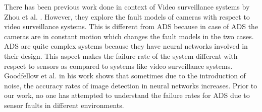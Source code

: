 There has been previous work done in context of Video surveillance systems by Zhou et al. \cite{Zhou}. However, they explore the fault models of cameras with respect to video surveillance systems. This is different from ADS because in case of ADS the cameras are in constant motion which changes the fault models in the two cases. ADS are quite complex systems because they have neural networks involved in their design. This aspect makes the failure rate of the system different with respect to sensors as compared to systems like video surveillance systems. Goodfellow et al. \cite{Goodfellow} in his work shows that sometimes due to the introduction of noise, the accuracy rates of image detection in neural networks increases. Prior to our work, no one has attempted to understand the failure rates for ADS due to sensor faults in different environments. 